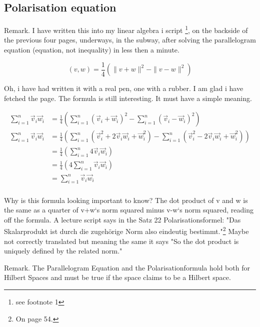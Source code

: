 \documentclass[a4paper]{article}
\begin{document}
\subsection{Polarisation equation}

Remark. I have written this into my linear algebra i script \cite{FerusLA}\footnote{see footnote 1}, on the backside of the previous four pages, underways, 
in the subway, after solving the parallelogram equation (equation, not inequality) in less then a minute. 

\begin{displaymath}
(v,w) = \frac{1}{4}(\|v+w\|^{2}-\|v-w\|^{2})
\end{displaymath}

Oh, i have had written it with a real pen, one with a rubber. I am glad i have fetched the page. The formula is still interesting.
It must have a simple meaning.

\begin{displaymath}
\begin{align}
\sum_{i=1}^{n}\vec{v}_{i}\vec{w}_{i} &= \frac{1}{4}(\sum_{i=1}^{n}(\vec{v}_{i}+\vec{w}_{i})^{2} - \sum_{i=1}^{n}(\vec{v}_{i}-\vec{w}_{i})^{2}) \\
\sum_{i=1}^{n}\vec{v}_{i}\vec{w}_{i} &= \frac{1}{4}(\sum_{i=1}^{n}(\vec{v}_{i}^{2}+2\vec{v}_{i}\vec{w}_{i}+\vec{w}_{i}^{2})-\sum_{i=1}^{n}(\vec{v}_{i}^{2}-2\vec{v}_{i}\vec{w}_{i}+\vec{w}_{i}^{2}))\\
&= \frac{1}{4}(\sum_{i=1}^{n}4\vec{v}_{i}\vec{w}_{i})\\
&= \frac{1}{4}(4\sum_{i=1}^{n}\vec{v}_{i}\vec{w}_{i})\\
&= \sum_{i=1}^{n}\vec{v}_{i}\vec{w}_{i}\\
\end{align}
\end{displaymath}

Why is this formula looking important to know? The dot product of v and w is the same as a quarter of v+w`s norm squared minus v-w`s norm squared, reading off the formula. A lecture script \cite{FerusLA} says in the Satz 22 Polarisationsformel: "Das Skalarprodukt ist durch die zugeh\"orige Norm also eindeutig bestimmt."\footnote{On page 54.} Maybe not correctly translated but meaning the same it says "So the dot product is uniquely defined by the related norm."

Remark. The Parallelogram Equation and the Polarisationformula hold both for Hilbert Spaces and must be true if the space claims to be a Hilbert space.
\end{document}
